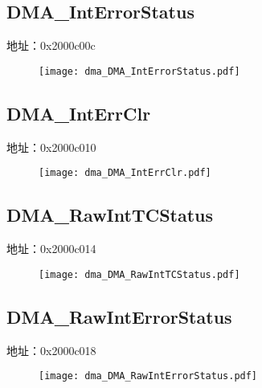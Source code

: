 \subsection{DMA\_IntErrorStatus}
\label{dma-DMA-IntErrorStatus}
地址：0x2000c00c
 \begin{figure}[H]
\texttt{[image: dma\_DMA\_IntErrorStatus.pdf]}
\end{figure}

\subsection{DMA\_IntErrClr}
\label{dma-DMA-IntErrClr}
地址：0x2000c010
 \begin{figure}[H]
\texttt{[image: dma\_DMA\_IntErrClr.pdf]}
\end{figure}

\subsection{DMA\_RawIntTCStatus}
\label{dma-DMA-RawIntTCStatus}
地址：0x2000c014
 \begin{figure}[H]
\texttt{[image: dma\_DMA\_RawIntTCStatus.pdf]}
\end{figure}

\subsection{DMA\_RawIntErrorStatus}
\label{dma-DMA-RawIntErrorStatus}
地址：0x2000c018
 \begin{figure}[H]
\texttt{[image: dma\_DMA\_RawIntErrorStatus.pdf]}
\end{figure}

